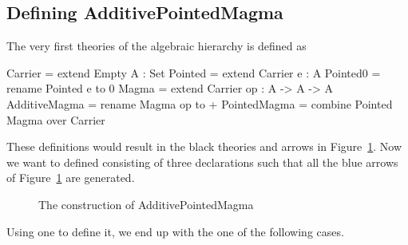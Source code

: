 \subsection{Defining AdditivePointedMagma}
The very first theories of the algebraic hierarchy is defined as 
\begin{togcode} 
Carrier = extend Empty {A : Set}
Pointed = extend Carrier {e : A}
Pointed0 = rename Pointed {e to 0} 
Magma = extend Carrier {op : A -> A -> A}
AdditiveMagma = rename Magma {op to +} 
PointedMagma = combine Pointed {} Magma {} over Carrier
\end{togcode} 
These definitions would result in the black theories and arrows in Figure~\ref{fig:addPointedMagma}. Now we want to defined  consisting of three declarations  such that all the blue arrows of 
Figure~\ref{fig:addPointedMagma} are generated. 
\begin{figure}[h]
    \caption{The construction of AdditivePointedMagma}
    \label{fig:addPointedMagma}
\end{figure}
Using one  to define it, we end up with the one of the following cases. 
